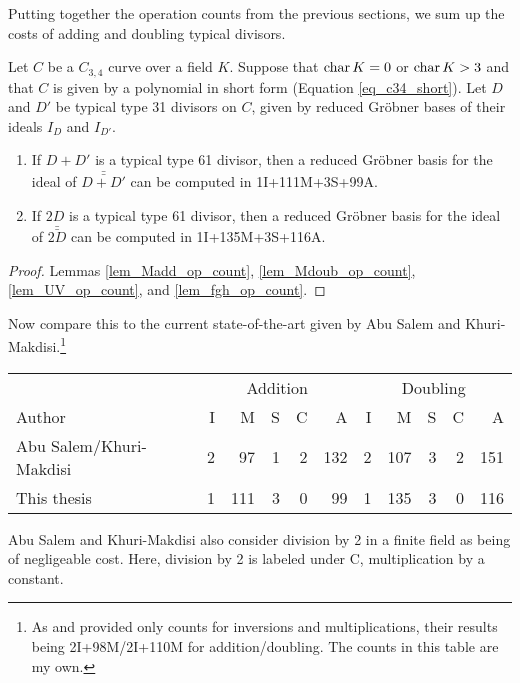 Putting together the operation counts from the previous sections,
we sum up the costs of adding and doubling typical divisors.
\begin{theorem}
  \label{thm_op_count}
  Let $C$ be a $C_{3,4}$ curve over a field $K$.
  Suppose that $\operatorname{char} K = 0$ or $\operatorname{char} K > 3$ and that $C$ is given by a polynomial in short form
  (Equation \ref{eq_c34_short}).
  Let $D$ and $D'$ be typical type 31 divisors on $C$,
  given by reduced Gr\"obner bases of their ideals $I_D$ and $I_{D'}$.
  \begin{enumerate}[label=(\roman*)]
    \item
    If $D + D'$ is a typical type 61 divisor,
    then a reduced Gr\"obner basis for the ideal of $\bar{\bar{D + D'}}$ can be computed in 1I+111M+3S+99A.
    \item
    If $2D$ is a typical type 61 divisor, 
    then a reduced Gr\"obner basis for the ideal of $\bar{\bar {2D}}$ can be computed in 1I+135M+3S+116A.
  \end{enumerate}
\end{theorem}
\begin{proof}
  Lemmas \ref{lem_Madd_op_count}, \ref{lem_Mdoub_op_count}, \ref{lem_UV_op_count}, and \ref{lem_fgh_op_count}.
\end{proof}

Now compare this to the current state-of-the-art given by
Abu Salem and Khuri-Makdisi.\footnote{
As \cite{kmakdisi18} and \cite{salem07} provided only counts for inversions and multiplications,
their results being 2I+98M/2I+110M for addition/doubling. The counts in this table are my own.}
\begin{center}
\begin{tabular}{|l|rrrrr|rrrrr|}
  \hline
  & \multicolumn{5}{c|}{Addition} & \multicolumn{5}{c|}{Doubling} \\
  Author                  & I &  M & S & C &   A & I &   M & S & C & A \\
  \hline
  Abu Salem/Khuri-Makdisi \cite{kmakdisi18,salem07}
                          & 2 & 97 &  1 & 2 & 132 & 2 & 107 &  3 & 2 & 151 \\
  This thesis             & 1 & 111 & 3 & 0 &  99 & 1 & 135 &  3 & 0 & 116 \\
  \hline
\end{tabular}
\end{center}
Abu Salem and Khuri-Makdisi also consider division by 2 in a finite field as being of negligeable cost.
Here, division by 2 is labeled under C, multiplication by a constant.

